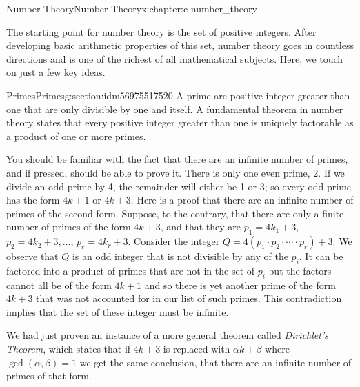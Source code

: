 \documentclass[twoside,10pt,]{book}
\numberwithin{equation}{section}
\begin{document}
\begin{chapterptx}{Number Theory}{}{Number Theory}{}{}{x:chapter:c-number_theory}
\begin{introduction}{}%
The starting point for number theory is the set of positive integers.  After developing basic arithmetic properties of this set, number theory goes in countless directions and is one of the richest of all mathematical subjects. Here, we touch on just a few key ideas.%
\end{introduction}%
%
%
\typeout{************************************************}
\typeout{************************************************}
%
\begin{sectionptx}{Primes}{}{Primes}{}{}{g:section:idm56975517520}
A prime are positive integer greater than one that are only divisible by one and itself. A fundamental theorem in number theory states that every positive integer greater than one is uniquely factorable as a product of one or more primes.%
\par
You should be familiar with the fact that there are an infinite number of primes, and if pressed, should be able to prove it.  There is only one even prime, 2. If we divide an odd prime by 4, the remainder will either be 1 or 3; so every odd prime has the form \(4k+1\) or \(4k+3\).  Here is a proof that there are an infinite number of primes of the second form. Suppose, to the contrary, that there are only a finite number of primes of the form \(4k+3\), and that they are  \(p_1=4k_1+3\), \(p_2=4k_2+3, \dots\), \(p_r=4k_r+3\).  Consider the integer \(Q= 4(p_1 \cdot p_2 \cdot \cdots \cdot p_r)+3\).  We observe that \(Q\) is an odd integer that is not divisible by any of the \(p_i\). It can be factored into a product of primes that are not in the set of \(p_i\) but the factors cannot all be of the form \(4k+1\) and so there is yet another prime of the form \(4k+3\) that was not accounted for in our list of such primes.  This contradiction implies that the set of these integer must be infinite.%
\par
We had just proven an instance of a more general theorem called \emph{Dirichlet's Theorem}, which states that if \(4k+3\) is replaced with \(\alpha k + \beta\) where \(\gcd(\alpha,\beta)=1\) we get the same conclusion, that there are an infinite number of primes of that form.%
\end{sectionptx}
%
%
\typeout{************************************************}
\typeout{************************************************}

\end{chapterptx}
\end{document}
